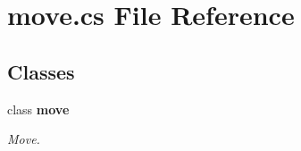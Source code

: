\section{move.\+cs File Reference}
\label{move_8cs}
\subsection*{Classes}
\begin{DoxyCompactItemize}
\item 
class {\bf move}
\begin{DoxyCompactList}\small\item\em Move. \end{DoxyCompactList}\end{DoxyCompactItemize}
